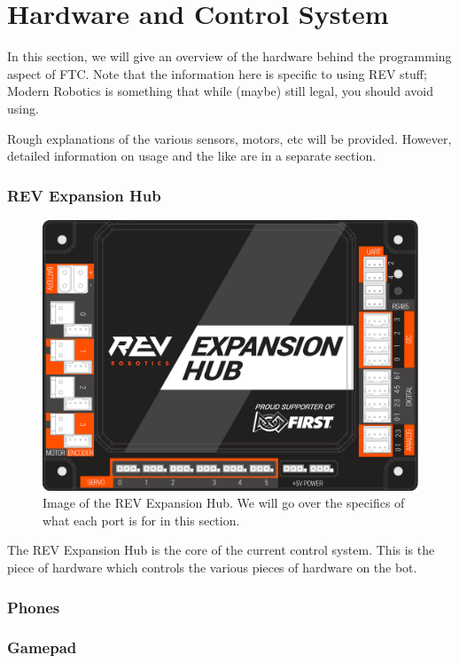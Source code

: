 \documentclass[../main.tex]{subfiles}
\begin{document}
\newpage
\part{Hardware and Control System}
In this section, we will give an overview of the hardware behind the programming aspect of FTC. Note that the information here is specific to using REV stuff; Modern Robotics is something that while (maybe) still legal, you should avoid using.

Rough explanations of the various sensors, motors, etc will be provided. However, detailed information on usage and the like are in a separate section.
\section{REV Expansion Hub}
\begin{figure}[H]
    \includegraphics{sections/controlSystem/images/expansion_hub_four.png}
    \caption{Image of the REV Expansion Hub. We will go over the specifics of what each port is for in this section.}
\end{figure}
The REV Expansion Hub is the core of the current control system. This is the piece of hardware which controls the various pieces of hardware on the bot. 
\section{Phones}
\section{Gamepad}
\end{document}
